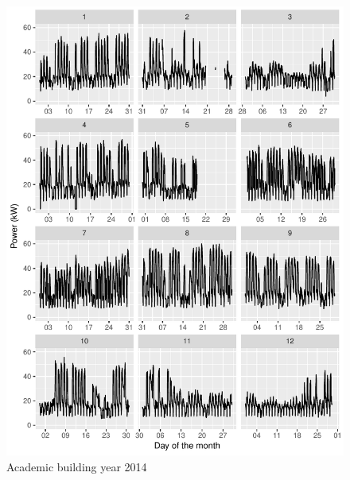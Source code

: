 \documentclass[11pt, oneside]{article}   	%
\begin{document}
\begin{figure}
\includegraphics[keepaspectratio]{acad_build_Y2014.pdf}
\caption{Academic building year 2014 }
\end{figure}
\end{document}
